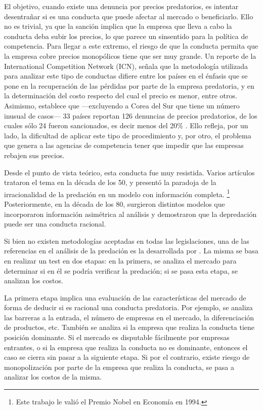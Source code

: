\documentclass[
  12pt,
  spanish,
]{book}
\begin{document}
El objetivo, cuando existe una denuncia por precios predatorios, es
intentar desentrañar si es una conducta que puede afectar al mercado o
beneficiarlo. Ello no es trivial, ya que la sanción implica que la
empresa que lleva a cabo la conducta deba subir los precios, lo que
parece un sinsentido para la política de competencia. Para llegar a este
extremo, el riesgo de que la conducta permita que la empresa cobre
precios monopólicos tiene que ser muy grande. Un reporte de la
International Competition Network (ICN), señala que la metodología
utilizada para analizar este tipo de conductas difiere entre los países
en el énfasis que se pone en la recuperación de las pérdidas por parte
de la empresa predatoria, y en la determinación del costo respecto del
cual el precio es menor, entre otros. Asimismo, establece que
---excluyendo a Corea del Sur que tiene un número inusual de casos--- 33
países reportan 126 denuncias de precios predatorios, de los cuales sólo
24 fueron sancionados, es decir menos del 20\% \citep{ICN2008}. Ello
refleja, por un lado, la dificultad de aplicar este tipo de
procedimiento y, por otro, el problema que genera a las agencias de
competencia tener que impedir que las empresas rebajen sus precios.

Desde el punto de vista teórico, esta conducta fue muy resistida. Varios
artículos trataron el tema en la década de los 50, y \citet{Selten1978}
presentó la paradoja de la irracionalidad de la predación en un modelo
con información completa. \footnote{Este trabajo le valió el Premio
  Nobel en Economía en 1994.} Posteriormente, en la década de los 80,
surgieron distintos modelos que incorporaron información asimétrica al
análisis y demostraron que la depredación puede ser una conducta
racional.

Si bien no existen metodologías aceptadas en todas las legislaciones,
una de las referencias en el análisis de la predación es la desarrollada
por \citet{Joskow1979}. La misma se basa en realizar un test en dos
etapas: en la primera, se analiza el mercado para determinar si en él se
podría verificar la predación; si se pasa esta etapa, se analizan los
costos.

La primera etapa implica una evaluación de las características del
mercado de forma de deducir si es racional una conducta predatoria. Por
ejemplo, se analiza las barreras a la entrada, el número de empresas en
el mercado, la diferenciación de productos, etc. También se analiza si
la empresa que realiza la conducta tiene posición dominante. Si el
mercado es disputable fácilmente por empresas entrantes, o si la empresa
que realiza la conducta no es dominante, entonces el caso se cierra sin
pasar a la siguiente etapa. Si por el contrario, existe riesgo de
monopolización por parte de la empresa que realiza la conducta, se pasa
a analizar los costos de la misma.
\end{document}
